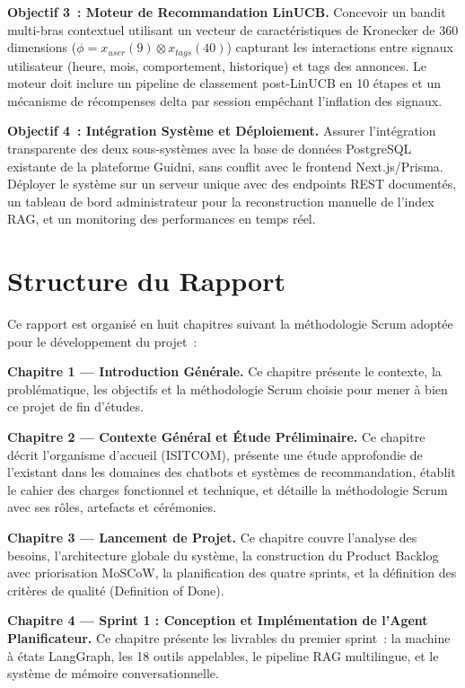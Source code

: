 \textbf{Objectif 3~: Moteur de Recommandation LinUCB.} Concevoir un bandit multi-bras contextuel 
utilisant un vecteur de caractéristiques de Kronecker de 360 dimensions ($\phi = x_{user}(9) 
\otimes x_{tags}(40)$) capturant les interactions entre signaux utilisateur (heure, mois, 
comportement, historique) et tags des annonces. Le moteur doit inclure un pipeline de classement 
post-LinUCB en 10 étapes et un mécanisme de récompenses delta par session empêchant l'inflation 
des signaux.

\textbf{Objectif 4~: Intégration Système et Déploiement.} Assurer l'intégration transparente des 
deux sous-systèmes avec la base de données PostgreSQL existante de la plateforme Guidni, sans 
conflit avec le frontend Next.js/Prisma. Déployer le système sur un serveur unique avec des 
endpoints REST documentés, un tableau de bord administrateur pour la reconstruction manuelle de 
l'index RAG, et un monitoring des performances en temps réel.

\section{Structure du Rapport}

Ce rapport est organisé en huit chapitres suivant la méthodologie Scrum adoptée pour le 
développement du projet~:

\textbf{Chapitre 1 — Introduction Générale.} Ce chapitre présente le contexte, la problématique, 
les objectifs et la méthodologie Scrum choisie pour mener à bien ce projet de fin d'études.

\textbf{Chapitre 2 — Contexte Général et Étude Préliminaire.} Ce chapitre décrit l'organisme 
d'accueil (ISITCOM), présente une étude approfondie de l'existant dans les domaines des chatbots 
et systèmes de recommandation, établit le cahier des charges fonctionnel et technique, et détaille 
la méthodologie Scrum avec ses rôles, artefacts et cérémonies.

\textbf{Chapitre 3 — Lancement de Projet.} Ce chapitre couvre l'analyse des besoins, l'architecture 
globale du système, la construction du Product Backlog avec priorisation MoSCoW, la planification 
des quatre sprints, et la définition des critères de qualité (Definition of Done).

\textbf{Chapitre 4 — Sprint 1 : Conception et Implémentation de l'Agent Planificateur.} Ce 
chapitre présente les livrables du premier sprint~: la machine à états LangGraph, les 18 outils 
appelables, le pipeline RAG multilingue, et le système de mémoire conversationnelle.

